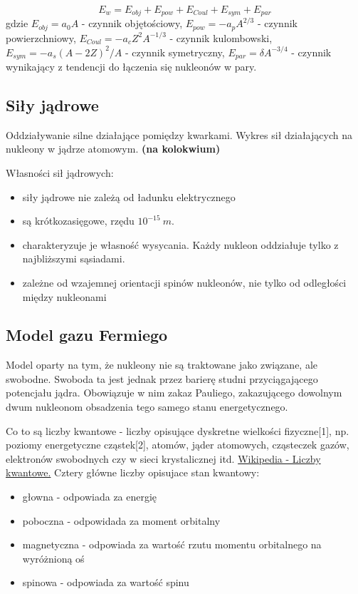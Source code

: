 \documentclass{article}
\begin{document}
\begin{equation}
    E_w = E_{obj} + E_{pow} + E_{Coul} + E_{sym} + E_{par}
\end{equation}
gdzie $E_{obj} = a_0 A$ - czynnik objętościowy, $E_{pow} = -a_p A^{2/3}$ - czynnik powierzchniowy, $E_{Coul} = -a_c Z^2 A^{-1/3}$ - czynnik kulombowski, $E_{sym} = -a_s (A-2Z)^2/A$ - czynnik symetryczny, $E_{par} = \delta A^{-3/4}$ - czynnik wynikający z tendencji do łączenia się nukleonów w pary.

\subsection{Siły jądrowe}
Oddziaływanie silne działające pomiędzy kwarkami.
Wykres sił działających na nukleony w jądrze atomowym. \textbf{(na kolokwium)}

Własności sił jądrowych:
\begin{itemize}
    \item siły jądrowe nie zależą od ładunku elektrycznego
    \item są krótkozasięgowe, rzędu $10^{-15}~m$.
    \item charakteryzuje je własność wysycania. Każdy nukleon oddziałuje tylko z najbliższymi sąsiadami.
    \item zależne od wzajemnej orientacji spinów nukleonów, nie tylko od odległości między nukleonami
\end{itemize}

\subsection{Model gazu Fermiego}
Model oparty na tym, że nukleony nie są traktowane jako związane, ale swobodne. Swoboda ta jest jednak przez barierę studni przyciągającego potencjału jądra. Obowiązuje w nim zakaz Pauliego, zakazującego dowolnym dwum nukleonom obsadzenia tego samego stanu energetycznego.

Co to są liczby kwantowe -  liczby opisujące dyskretne wielkości fizyczne[1], np. poziomy energetyczne cząstek[2], atomów, jąder atomowych, cząsteczek gazów, elektronów swobodnych czy w sieci krystalicznej itd.
\href{https://pl.wikipedia.org/wiki/Liczby_kwantowe}{Wikipedia - Liczby kwantowe.}
Cztery główne liczby opisujace stan kwantowy:
\begin{itemize}
    \item głowna - odpowiada za energię
    \item poboczna - odpowidada za moment orbitalny
    \item magnetyczna - odpowiada za wartość rzutu momentu orbitalnego na wyróżnioną oś
    \item spinowa - odpowiada za wartość spinu
\end{itemize}
\end{document}
